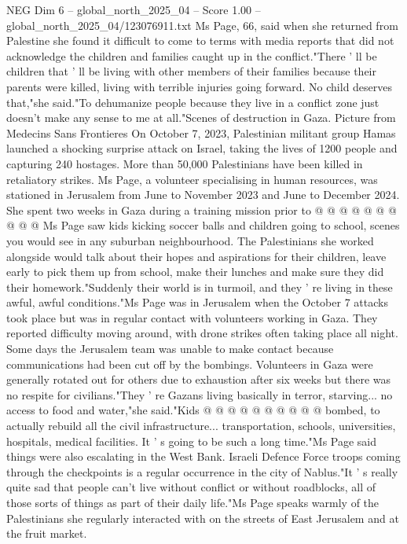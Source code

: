 \begin{textsample}{NEG Dim 6 – global\_north\_2025\_04 – Score 1.00 – global\_north\_2025\_04/123076911.txt}  \label{ex:f6_neg_245}
Ms Page, 66, said when she returned from Palestine she found it difficult to come to terms with media reports that did not acknowledge the children and families caught up in the conflict."There ' ll be children that ' ll be living with other members of their families because their parents were killed, living with terrible injuries going forward.
No child deserves that,"she said."To dehumanize people because they live in a conflict zone just doesn't make any sense to me at all."Scenes of destruction in Gaza.
Picture from Medecins Sans Frontieres On October 7, 2023, Palestinian militant group Hamas launched a shocking surprise attack on Israel, taking the lives of 1200 people and capturing 240 hostages.
More than 50,000 Palestinians have been killed in retaliatory strikes.
Ms Page, a volunteer specialising in human resources, was stationed in Jerusalem from June to November 2023 and June to December 2024.
She spent two weeks in Gaza during a training mission prior to @ @ @ @ @ @ @ @ @ @ Ms Page saw kids kicking soccer balls and children going to school, scenes you would see in any suburban neighbourhood.
The Palestinians she worked alongside would talk about their hopes and aspirations for their children, leave early to pick them up from school, make their lunches and make sure they did their homework."Suddenly their world is in turmoil, and they ' re living in these awful, awful conditions."Ms Page was in Jerusalem when the October 7 attacks took place but was in regular contact with volunteers working in Gaza.
They reported difficulty moving around, with drone strikes often taking place all night.
Some days the Jerusalem team was unable to make contact because communications had been cut off by the bombings.
Volunteers in Gaza were generally rotated out for others due to exhaustion after six weeks but there was no respite for civilians."They ' re Gazans living basically in terror, starving... no access to food and water,"she said."Kids @ @ @ @ @ @ @ @ @ @ bombed, to actually rebuild all the civil infrastructure... transportation, schools, universities, hospitals, medical facilities.
It ' s going to be such a long time."Ms Page said things were also escalating in the West Bank.
Israeli Defence Force troops coming through the checkpoints is a regular occurrence in the city of Nablus."It ' s really quite sad that people can't live without conflict or without roadblocks, all of those sorts of things as part of their daily life."Ms Page speaks warmly of the Palestinians she regularly interacted with on the streets of East Jerusalem and at the fruit market.

\end{textsample}
